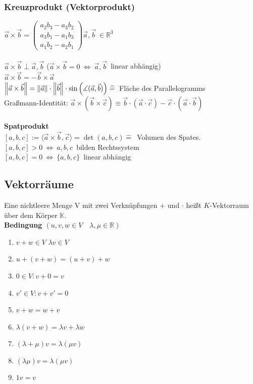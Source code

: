 \documentclass[6pt,a4paper]{scrartcl}
\newcommand{\norm}[2][\relax]{\ifx#1\relax \ensuremath{\left\Vert#2\right\Vert}\else \ensuremath{\left\Vert#2\right\Vert_{#1}}\fi}
\begin{document}
\begin{multicols*}{4}
\subsubsection{Kreuzprodukt (Vektorprodukt)}
$\vec a\times\vec b=\left( \begin{matrix} a_2b_3-a_3b_2\\a_3b_1-a_1b_3\\a_1b_2-a_2b_1\end{matrix}\right)$\qquad $\vec a,\vec b\ \in \mathbb R^3$\\
\\
$\vec a\times\vec b \perp \vec a,\vec b$ \qquad ($\vec a\times\vec b=0\ \Leftrightarrow\ \vec a,\vec b$\ linear abhängig)\\
$\vec{a} \times \vec{b} = -\vec{b} \times \vec{a}$\\
$\norm{\vec a\times\vec b}=\norm{\vec a}\cdot\norm{\vec b}\cdot \sin\left(\measuredangle (\vec a,\vec b)\right)\mathrel{\widehat{=}}$\ Fläche des Parallelogramms\\
Graßmann-Identität: $\vec a\times(\vec b \times \vec c)\equiv\vec b\cdot(\vec a \cdot \vec c)-\vec c\cdot(\vec a \cdot \vec b)$\\
\\
\textbf{Spatprodukt}\\
$[a,b,c]:=\langle \vec a\times\vec b,\vec c\rangle=\det (a,b,c)\mathrel{\widehat{=}}$\ Volumen des Spates.\\
$[a,b,c]>0\ \Leftrightarrow\ a,b,c$\ bilden Rechtssystem \\ $[a,b,c]=0\ \Leftrightarrow\ \{a,b,c\}$\ linear abhängig

\subsection{Vektorräume}
Eine nichtleere Menge V mit zwei Verknüpfungen $+$ und $\cdot$ heißt $K$-Vektorraum über dem Körper $\mathbb K$. \\
\textbf{Bedingung $(u,v,w\in V \quad \lambda,\mu \in \mathbb{R})$}
\begin{enumerate}\itemsep0pt
\item $v+w\in V$ \qquad $\lambda v \in V$
\item $u+(v+w)=(u+v)+w$
\item $0\in V: v+0=v$
\item $v'\in V: v+v'=0$
\item $v+w=w+v$
\item $\lambda(v+w)=\lambda v + \lambda w$
\item $(\lambda + \mu)v=\lambda(\mu v)$
\item $(\lambda \mu)v = \lambda(\mu v)$
\item $1v=v$
\end{enumerate}\itemsep0pt

\end{multicols*}
\end{document}
